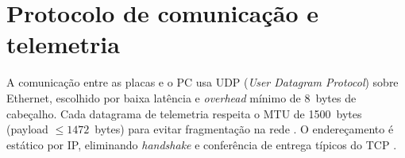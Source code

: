 \section{Protocolo de comunicação e telemetria}

A comunicação entre as placas e o PC usa UDP (\textit{User Datagram Protocol}) sobre Ethernet, escolhido por baixa latência e \textit{overhead} mínimo de 8~bytes de cabeçalho. Cada datagrama de telemetria respeita o MTU de 1500~bytes (payload $\leq 1472$~bytes) para evitar fragmentação na rede \cite{shichao_udp}. O endereçamento é estático por IP, eliminando \textit{handshake} e conferência de entrega típicos do TCP \cite{pinheiro2004}.
